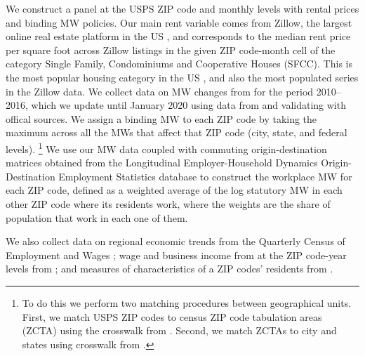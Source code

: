 We construct a panel at the USPS ZIP code and monthly levels with rental prices 
and binding MW policies.
Our main rent variable comes from Zillow, the largest online real estate platform 
in the US \parencite{realestateagentpdx, investopedia}, and corresponds to the 
median rent price per square foot across Zillow listings in the given ZIP code-month 
cell of the category Single Family, Condominiums and Cooperative Houses (SFCC).
This is the most popular housing category in the US \parencite{Fernald2020}, 
and also the most populated series in the Zillow data.
We collect data on MW changes from \textcite{VaghulZipperer2016} for the period 
2010--2016, which we update until January 2020 using data from 
\textcite{BerkeleyLaborCenter} and validating with offical sources.
We assign a binding MW to each ZIP code by taking the maximum across all the
MWs that affect that ZIP code (city, state, and federal levels).%
\footnote{To do this we perform two matching procedures between geographical units.
First, we match USPS ZIP codes to census ZIP code tabulation areas (ZCTA) using 
the crosswalk from \textcite{UDSMapper}.
Second, we match ZCTAs to city and states using crosswalk from 
\textcite{MissouriCenter}.}
We use our MW data coupled with commuting origin-destination matrices obtained from 
the Longitudinal Employer-Household Dynamics Origin-Destination Employment 
Statistics \textcite[LODES;][]{LODES} database to construct the workplace MW for 
each ZIP code, defined as a weighted average of the log statutory MW in each other 
ZIP code where its residents work, where the weights are the share of population 
that work in each one of them.

We also collect data on 
regional economic trends from the Quarterly Census of Employment and Wages 
\textcite[QCEW;][]{QCEW}; 
wage and business income from at the ZIP code-year levels from \textcite{IRS}; and 
measures of characteristics of a ZIP codes' residents from \textcite{ACS, 
IPUMS_NHGIS}.



